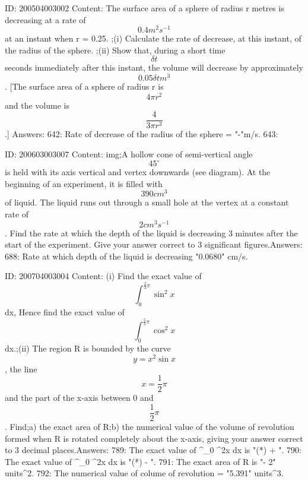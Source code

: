 \documentclass{article}
\begin{document}
ID: 200504003002
Content:
The surface area of a sphere of radius r metres is decreasing at a rate of  $$0.4m^2 s^{-1} $$ at an instant when r = 0.25. ;(i) Calculate the rate of decrease, at this instant, of the radius of the sphere. ;(ii) Show that, during a short time  $$\delta t$$ seconds immediately after this instant, the volume will decrease by approximately  $$0.05\delta tm^3 $$.  [The surface area of a sphere of radius r is  $$4\pi r^2 $$ and the volume is  $$\frac{4}{3\pi r^3} $$.] Answers:
642: Rate of decrease of the radius of the sphere = "-"m/s.
643: 

ID: 200603003007
Content:
img;A hollow cone of semi-vertical angle $$45^{\circ}$$ is held with its axis vertical and vertex downwards (see diagram). At the beginning of an experiment, it is filled with $$390 cm^{3}$$ of liquid. The liquid runs out through a small hole at the vertex at a constant rate of $$2 cm^{3}s^{-1}$$. Find the rate at which the depth of the liquid is decreasing 3 minutes after the start of the experiment. Give your answer correct to 3 significant figures.Answers:
688: Rate at which depth of the liquid is decreasing "0.0680" cm/s.

ID: 200704003004
Content:
(i) Find the exact value of $$\int^{\frac{2}{3}\pi}_{0} \sin^{2}{x}$$ dx, Hence find the exact value of $$ \int^{\frac{5}{3}\pi}_{0} \cos^{2}{x}$$ dx.;(ii) The region R is bounded by the curve $$ y = x^2\sin{x}$$, the line $$ x = \frac{1}{2}\pi$$ and the part of the x-axis between 0 and $$\frac{1}{2}\pi$$. Find;a) the exact area of R;b) the numerical value of the volume of revolution formed when R is rotated completely about the x-axis, giving your answer correct to 3 decimal places.Answers:
789: The exact value of \int^{\pi}_{0} \sin^{2}{x} dx is "(*\pi) + ".
790: The exact value of  \int^{\pi}_{0} \cos^{2}{x} dx is "(*\pi) - ".
791: The exact area of R is "\pi - 2" units^2.
792: The numerical value of colume of revolution = "5.391" units^3.
\end{document}
